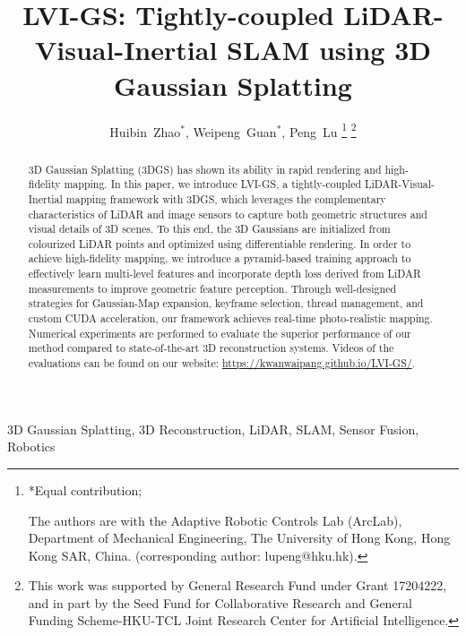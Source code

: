 \documentclass[lettersize,journal]{IEEEtran}
\begin{document}
\title{LVI-GS: Tightly-coupled LiDAR-Visual-Inertial SLAM using 3D Gaussian Splatting}

\author{Huibin~Zhao$^{*}$, Weipeng~Guan$^{*}$,   Peng~Lu  %
    \thanks{
        *Equal contribution; 
    
        The authors are with the Adaptive Robotic Controls Lab (ArcLab), Department of Mechanical Engineering, The University of Hong Kong, Hong Kong SAR, China.
        (corresponding author: lupeng@hku.hk). 
        }%
    \thanks{
        This work was supported by General Research Fund under Grant 17204222, and in part by the Seed Fund for Collaborative Research and General Funding Scheme-HKU-TCL Joint Research Center for Artificial Intelligence.
        }%
}



\maketitle

\begin{abstract}

3D Gaussian Splatting (3DGS) has shown its ability in rapid rendering and high-fidelity mapping.
In this paper, we introduce LVI-GS, a tightly-coupled LiDAR-Visual-Inertial mapping framework with 3DGS, which leverages the complementary characteristics of LiDAR and image sensors to capture both geometric structures and visual details of 3D scenes.
To this end, the 3D Gaussians are initialized from colourized LiDAR points and optimized using differentiable rendering.
In order to achieve high-fidelity mapping, we introduce a pyramid-based training approach to effectively learn multi-level features and incorporate depth loss derived from LiDAR measurements to improve geometric feature perception.
Through well-designed strategies for Gaussian-Map expansion, keyframe selection, thread management, and custom CUDA acceleration, our framework achieves real-time photo-realistic mapping.
Numerical experiments are performed to evaluate the superior performance of our method compared to state-of-the-art 3D reconstruction systems.
Videos of the evaluations can be found on our website: \url{https://kwanwaipang.github.io/LVI-GS/}.
\end{abstract}

\begin{IEEEkeywords}
3D Gaussian Splatting, 3D Reconstruction, LiDAR, SLAM, Sensor Fusion, Robotics
\end{IEEEkeywords}
\end{document}
